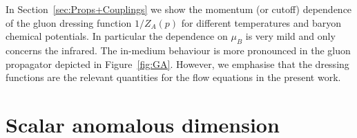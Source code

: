 \documentclass[%
reprint,
superscriptaddress,
showpacs,preprintnumbers,
 amsmath,amssymb,
 aps,
prd,
]{revtex4-1}
\def\fig#1{Figure~\ref{#1}}
\def\sec#1{Section~\ref{#1}}
\begin{document}
In \sec{sec:Props+Couplings} we show the momentum (or cutoff)
dependence of the gluon dressing function $1/Z_A(p)$ for different
temperatures and baryon chemical potentials. In particular the
dependence on $\mu_B$ is very mild and only concerns the infrared. The
in-medium behaviour is more pronounced in the gluon propagator
depicted in \fig{fig:GA}. However, we emphasise that the dressing
functions are the relevant quantities for the flow equations in the
present work.



\section{Scalar anomalous dimension}
\label{app:etaphi}
\end{document}

